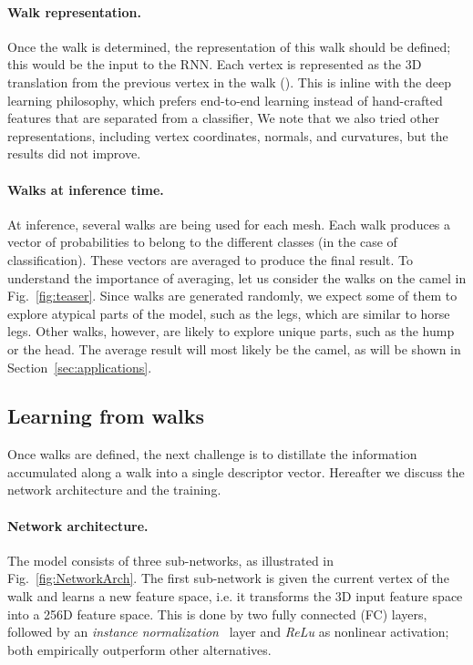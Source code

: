\documentclass[acmtog]{acmart}
\begin{document}
\paragraph{Walk representation.}
 Once the walk  is determined, the representation  of this walk should be defined; this would be the input to the RNN. 
Each vertex is represented as the 3D translation from the previous vertex in the walk ().
This is inline with the deep learning philosophy, which prefers end-to-end learning instead of hand-crafted features that are separated from a classifier, 
We note that we also tried other representations, including vertex coordinates, normals, and curvatures, but the results did not improve.

\paragraph{Walks at inference time.}
At inference, several walks are being used for each mesh.
Each walk produces a vector of probabilities to belong to the different classes (in the case of classification).
These vectors are averaged to produce the final result.
To understand the importance of averaging, let us consider the walks on the camel in Fig.~\ref{fig:teaser}.
Since walks are generated randomly, we expect some of them to explore atypical parts of the model, such as the legs, which are similar to horse legs.
Other walks, however, are likely to explore unique parts, such as the hump or the head.
The average result will most likely be the camel, as will be shown in Section~\ref{sec:applications}.



\subsection{Learning from walks}
\label{subsec:learning}
Once walks are defined, the next challenge is 
to distillate the information accumulated along a walk into a single descriptor vector.
Hereafter we  discuss the network architecture and the training. 

\paragraph{Network architecture.}
The model consists of three sub-networks, as illustrated in  Fig.~\ref{fig:NetworkArch}.
The first sub-network is given the current vertex of the walk and learns a new feature space, i.e.  it transforms the 3D input feature space into a 256D feature space.
This is done by two fully connected (FC) layers, followed by an {\em instance normalization}~\cite{ulyanov2016instance} layer and  {\em ReLu} as nonlinear activation;
both empirically outperform other alternatives.
\end{document}
